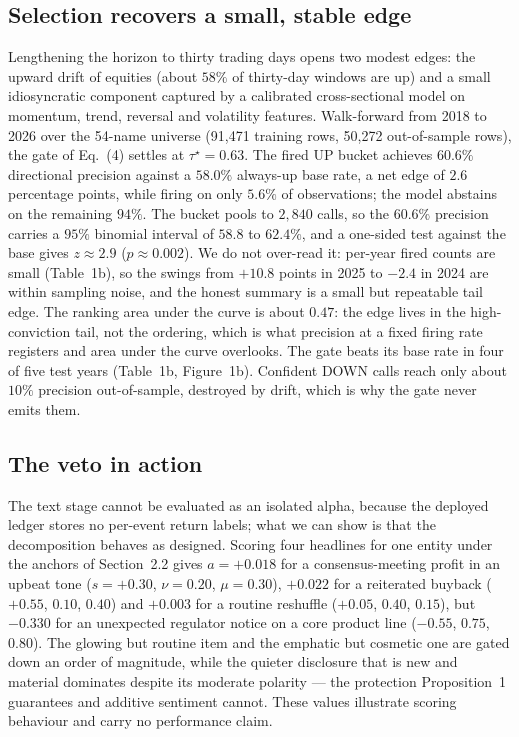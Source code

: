 \documentclass[12pt,a4paper]{article}
\begin{document}
\subsection{Selection recovers a small, stable edge}

Lengthening the horizon to thirty trading days opens two modest edges: the upward
drift of equities (about $58\%$ of thirty-day windows are up) and a small
idiosyncratic component captured by a calibrated cross-sectional model on momentum,
trend, reversal and volatility features. Walk-forward from 2018 to 2026 over the
54-name universe (91{,}471 training rows, 50{,}272 out-of-sample rows), the gate of
Eq.~(4) settles at $\tau^\star=0.63$. The fired UP bucket achieves $60.6\%$
directional precision against a $58.0\%$ always-up base rate, a net edge of $2.6$
percentage points, while firing on only $5.6\%$ of observations; the model abstains
on the remaining $94\%$. The bucket pools to $2{,}840$ calls, so the $60.6\%$
precision carries a $95\%$ binomial interval of $58.8$ to $62.4\%$, and a one-sided
test against the base gives $z\approx2.9$ ($p\approx0.002$). We do not over-read it:
per-year fired counts are small (Table~1b), so the swings from $+10.8$ points in 2025
to $-2.4$ in 2024 are within sampling noise, and the honest summary is a small but
repeatable tail edge. The ranking area under the curve is about $0.47$: the edge
lives in the high-conviction tail, not the ordering, which is what precision at a
fixed firing rate registers and area under the curve overlooks. The gate beats its
base rate in four of five test years (Table~1b, Figure~1b). Confident DOWN calls
reach only about $10\%$ precision out-of-sample, destroyed by drift, which is why
the gate never emits them.

\subsection{The veto in action}

The text stage cannot be evaluated as an isolated alpha, because the deployed ledger
stores no per-event return labels; what we can show is that the decomposition
behaves as designed. Scoring four headlines for one entity under the anchors of
Section~2.2 gives $a=+0.018$ for a consensus-meeting profit in an upbeat tone
($s=+0.30$, $\nu=0.20$, $\mu=0.30$), $+0.022$ for a reiterated buyback ($+0.55$,
$0.10$, $0.40$) and $+0.003$ for a routine reshuffle ($+0.05$, $0.40$, $0.15$), but
$-0.330$ for an unexpected regulator notice on a core product line ($-0.55$, $0.75$,
$0.80$). The glowing but routine item and the emphatic but cosmetic one are gated
down an order of magnitude, while the quieter disclosure that is new and material
dominates despite its moderate polarity --- the protection Proposition~1 guarantees
and additive sentiment cannot. These values illustrate scoring behaviour and carry
no performance claim.
\end{document}
